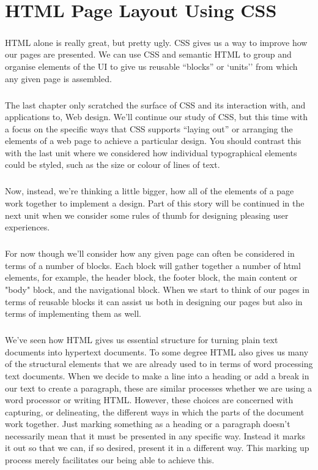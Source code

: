 \chapter{HTML Page Layout Using CSS}
\label{layout}
\paragraph{} HTML alone is really great, but pretty ugly. CSS gives us a way to improve how our pages are presented. We can use CSS and semantic HTML to group and organise elements of the UI to give us reusable ``blocks'' or `units'' from which any given page is assembled.
\paragraph{} The last chapter only scratched the surface of CSS and its interaction with, and applications to, Web design. We'll continue our study of CSS, but this time with a focus on the specific ways that CSS supports ``laying out'' or arranging the elements of a web page to achieve a particular design. You should contrast this with the last unit where we considered how individual typographical elements could be styled, such as the size or colour of lines of text. 
\paragraph{} Now, instead, we're thinking a little bigger, how all of the elements of a page work together to implement a design. Part of this story will be continued in the next unit when we consider some rules of thumb for designing pleasing user experiences. 
\paragraph{} For now though we'll consider how any given page can often be considered in terms of a number of blocks. Each block will gather together a number of html elements, for example, the header block, the footer block, the main content or "body" block, and the navigational block. When we start to think of our pages in terms of reusable blocks it can assist us both in designing our pages but also in terms of  implementing them as well.
\paragraph{} We've seen how HTML gives us essential structure for turning plain text documents into hypertext documents. To some degree HTML also gives us many of the structural elements that we are already used to in terms of word processing text documents. When we decide to make a line into a heading or add a break in our text to create a paragraph, these are similar processes whether we are using a word processor or writing HTML. However, these choices are concerned with capturing, or delineating, the different ways in which the parts of the document work together. Just marking something as a heading or a paragraph doesn't necessarily mean that it must be presented in any specific way. Instead it marks it out so that we can, if so desired, present it in a different way. This marking up process merely facilitates our being able to achieve this.
